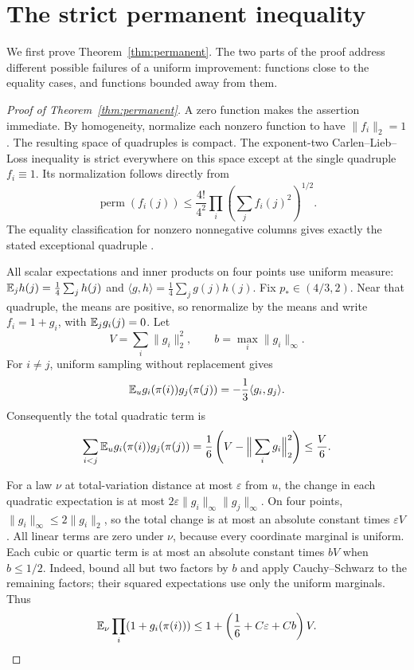 \section{The strict permanent inequality}\label{sec:permanent}
We first prove Theorem~\ref{thm:permanent}. The two parts of the proof address different possible failures of a uniform improvement: functions close to the equality cases, and functions bounded away from them.

\begin{proof}[Proof of Theorem~\ref{thm:permanent}]
A zero function makes the assertion immediate. By homogeneity, normalize each nonzero function to have $\|f_i\|_2=1$. The resulting space of quadruples is compact. The exponent-two Carlen--Lieb--Loss inequality is strict everywhere on this space except at the single quadruple $f_i\equiv1$. Its normalization follows directly from
\[
 \operatorname{perm}(f_i(j))\le\frac{4!}{4^2}
       \prod_i\left(\sum_j f_i(j)^2\right)^{1/2}.
\]
The equality classification for nonzero nonnegative columns gives exactly the stated exceptional quadruple \cite[Theorem~1.1 and equation~(1.4)]{cll2006}.

All scalar expectations and inner products on four points use uniform measure:
$\mathbb E_jh(j)=\tfrac14\sum_jh(j)$ and $\langle g,h\rangle=\tfrac14\sum_jg(j)h(j)$.
Fix $p_*\in(4/3,2)$. Near that quadruple, the means are positive, so renormalize by the means and write $f_i=1+g_i$, with $\mathbb E_jg_i(j)=0$. Let
\[
 V=\sum_i\|g_i\|_2^2,\qquad b=\max_i\|g_i\|_\infty.
\]
For $i\ne j$, uniform sampling without replacement gives
\[
 \mathbb E_u g_i(\pi(i))g_j(\pi(j))
 =-\frac13\langle g_i,g_j\rangle.
\]
Consequently the total quadratic term is
\begin{equation}\label{eq:quadratic}
 \sum_{i<j}\mathbb E_u g_i(\pi(i))g_j(\pi(j))
 =\frac16\left(V-\Big\|\sum_i g_i\Big\|_2^2\right)
 \le\frac V6.
\end{equation}

For a law $\nu$ at total-variation distance at most $\varepsilon$ from $u$, the change in each quadratic expectation is at most
$2\varepsilon\|g_i\|_\infty\|g_j\|_\infty$. On four points, $\|g_i\|_\infty\le2\|g_i\|_2$, so the total change is at most an absolute constant times $\varepsilon V$. All linear terms are zero under $\nu$, because every coordinate marginal is uniform. Each cubic or quartic term is at most an absolute constant times $bV$ when $b\le1/2$. Indeed, bound all but two factors by $b$ and apply Cauchy--Schwarz to the remaining factors; their squared expectations use only the uniform marginals. Thus
\begin{equation}\label{eq:lhs-local}
 \mathbb E_\nu\prod_i(1+g_i(\pi(i)))
 \le1+\left(\frac16+C\varepsilon+Cb\right)V.
\end{equation}


\end{proof}
